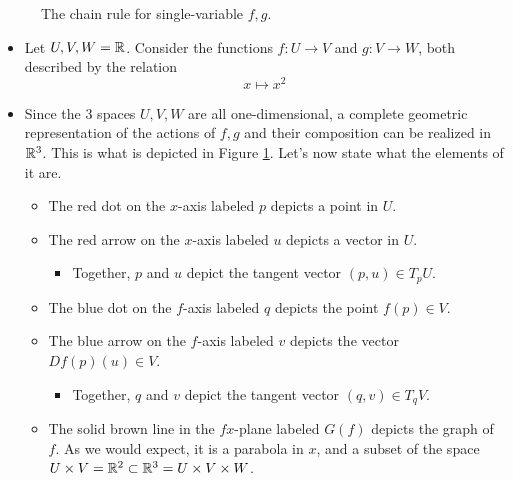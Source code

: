\documentclass[../notes.tex]{subfiles}
\begin{document}
\begin{itemize}
\begin{figure}[H]
        \caption{The chain rule for single-variable $f,g$.}
        \label{fig:chainRule}
    \end{figure}
    \begin{itemize}
        \item Let $U,V,W=\mathbb{R}$. Consider the functions $f:U\to V$ and $g:V\to W$, both described by the relation
        \begin{equation*}
            x \mapsto x^2
        \end{equation*}
        \item Since the 3 spaces $U,V,W$ are all one-dimensional, a complete geometric representation of the actions of $f,g$ and their composition can be realized in $\mathbb{R}^3$. This is what is depicted in Figure \ref{fig:chainRule}. Let's now state what the elements of it are.
        \begin{itemize}
            \item The red dot on the $x$-axis labeled $p$ depicts a point in $U$.
            \item The red arrow on the $x$-axis labeled $u$ depicts a vector in $U$.
            \begin{itemize}
                \item Together, $p$ and $u$ depict the tangent vector $(p,u)\in T_pU$.
            \end{itemize}
            \item The blue dot on the $f$-axis labeled $q$ depicts the point $f(p)\in V$.
            \item The blue arrow on the $f$-axis labeled $v$ depicts the vector $Df(p)(u)\in V$.
            \begin{itemize}
                \item Together, $q$ and $v$ depict the tangent vector $(q,v)\in T_qV$.
            \end{itemize}
            \item The solid brown line in the $fx$-plane labeled $G(f)$ depicts the graph of $f$. As we would expect, it is a parabola in $x$, and a subset of the space $U\times V=\mathbb{R}^2\subset\mathbb{R}^3=U\times V\times W$.

\end{itemize}
\end{itemize}
\end{itemize}
\end{document}
